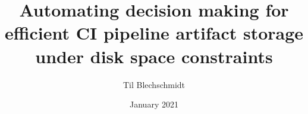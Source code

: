 \documentclass{BA}
\title{Automating decision making for efficient CI pipeline artifact storage under disk space constraints}
\author{Til Blechschmidt}
\date{January 2021}
\begin{document}
\begin{titlematter}
    \createtitle
\end{titlematter}

\pagebreak


\begin{frontmatter}
	\inhaltsverzeichnis{}
	\abbildungsverzeichnis{}
	\tabellenverzeichnis{}
\end{frontmatter}

\begin{multicols}{2}
    \begin{mainmatter}
        
    \end{mainmatter}
\end{multicols}

\begin{backmatter}
    
\end{backmatter}
\end{document}
